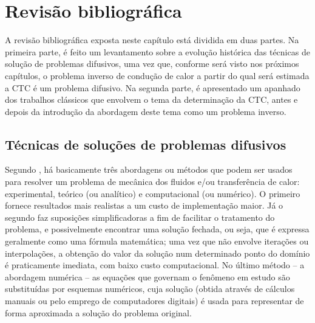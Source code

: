 \section{Revisão bibliográfica}

A revisão bibliográfica exposta neste capítulo está dividida em duas partes. Na primeira parte, é feito um levantamento sobre a evolução histórica
das técnicas de solução de problemas difusivos, uma vez que, conforme será visto nos próximos capítulos, o problema inverso de condução de calor
a partir do qual será estimada a CTC é um problema difusivo. Na segunda parte, é apresentado um apanhado dos trabalhos clássicos que envolvem o tema da
determinação da CTC, antes e depois da introdução da abordagem deste tema como um problema inverso.

\subsection{Técnicas de soluções de problemas difusivos}

Segundo \cite{livro_tanehill}, há basicamente três abordagens ou métodos que podem ser usados para resolver um problema
de mecânica dos fluidos e/ou transferência de calor: experimental, teórico (ou analítico) e computacional (ou numérico). O primeiro
fornece resultados mais realistas a um custo de implementação maior. Já o segundo faz suposições
simplificadoras a fim de facilitar o tratamento do problema, e possivelmente encontrar uma solução fechada, ou seja, que é expressa geralmente como uma fórmula
matemática; uma vez que não envolve iterações ou interpolações, a obtenção do valor da solução num determinado ponto do domínio é praticamente imediata,
com baixo custo computacional. No último método -- a abordagem numérica -- as equações que governam o fenômeno em estudo são substituídas por
esquemas numéricos, cuja solução (obtida através de cálculos manuais ou pelo emprego de computadores digitais) é usada para representar de forma
aproximada a solução do problema original.

